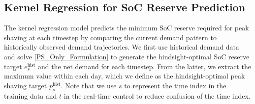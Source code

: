 \documentclass[conference]{IEEEtran}
\begin{document}





\subsection{Kernel Regression for SoC Reserve Prediction}\label{kernel_regression}


The kernel regression model predicts the minimum SoC reserve required for peak shaving at each timestep by comparing the current demand pattern to historically observed demand trajectories. We first use historical demand data and solve \eqref{PS_Only_Formulation} to generate the hindsight-optimal SoC reserve target $e^{\text{hist}}_s$ and the net demand for each timestep. From the latter, we extract the maximum value within each day, which we define as the hindsight-optimal peak shaving target $p^{\text{hist}}_s$. Note that we use $s$ to represent the time index in the training data and $t$ in the real-time control to reduce confusion of the time index. 
\end{document}
